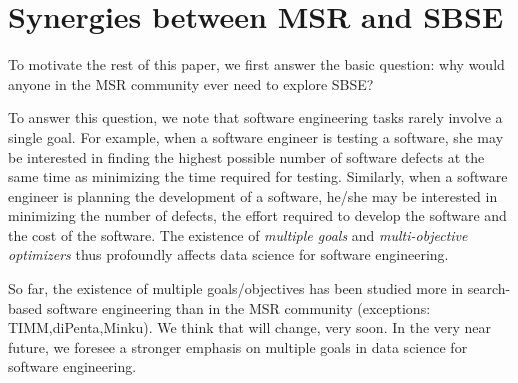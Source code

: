 \documentclass[table, xcdraw, sigconf,review, anonymous]{acmart}
\begin{document}




\section{Synergies between MSR and SBSE}

To motivate the rest of this paper, we first answer the basic question: why would anyone in the MSR
community ever need to explore SBSE?

 To answer this question, we note that
 software engineering tasks rarely involve a
single goal. For example, when a software engineer
is testing a software, she may be interested in
finding the highest possible number of software
defects at the same time as minimizing the time
required for testing. Similarly, when a software
engineer is planning the development of a software,
he/she may be interested in minimizing the number of
defects, the effort required to develop the software
and the cost of the software. The existence of {\em
multiple goals} and {\em multi-objective optimizers}
thus profoundly affects data science for software
engineering.

So far, the existence of multiple goals/objectives
has been studied more in search-based software
engineering than in the MSR community (exceptions: TIMM,diPenta,Minku). We think that will change, very
soon. In the very near future, we foresee a stronger
emphasis on multiple goals in data science for
software engineering.
\end{document}

